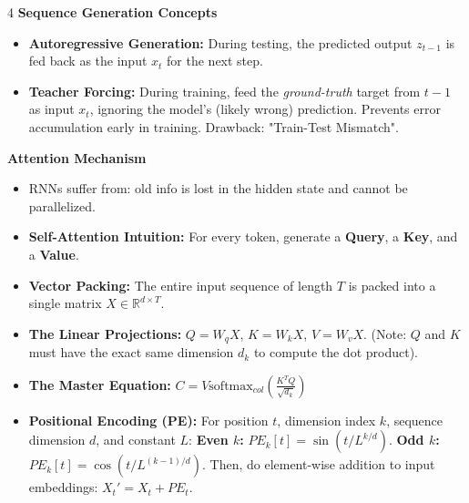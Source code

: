 \documentclass[8pt,landscape,a4paper]{extarticle}
\begin{document}
\begin{multicols*}{4}
\vspace{1mm}
\noindent\textbf{Sequence Generation Concepts}
\begin{itemize}[leftmargin=*, nosep]
    \item \textbf{Autoregressive Generation:} During testing, the predicted output $z_{t-1}$ is fed back as the input $x_t$ for the next step.
    \item \textbf{Teacher Forcing:} During training, feed the \textit{ground-truth} target from $t-1$ as input $x_t$, ignoring the model's (likely wrong) prediction. Prevents error accumulation early in training. Drawback: "Train-Test Mismatch".
\end{itemize}

\vspace{1mm}
\noindent\textbf{Attention Mechanism}
\begin{itemize}[leftmargin=*, nosep]
    \item RNNs suffer from: old info is lost in the hidden state and cannot be parallelized.
    \item \textbf{Self-Attention Intuition:} For every token, generate a \textbf{Query}, a \textbf{Key}, and a \textbf{Value}. 
    \item \textbf{Vector Packing:} The entire input sequence of length $T$ is packed into a single matrix $X \in \mathbb{R}^{d \times T}$.
    \item \textbf{The Linear Projections:} $Q = W_q X$, $K = W_k X$, $V = W_v X$. (Note: $Q$ and $K$ must have the exact same dimension $d_k$ to compute the dot product).
    \item \textbf{The Master Equation:} 
    $C = V \text{softmax}_{col} \left( \frac{K^T Q}{\sqrt{d_k}} \right)$
    \item \textbf{Positional Encoding (PE):} For position $t$, dimension index $k$, sequence dimension $d$, and constant $L$: 
    \textbf{Even $k$:} $PE_k[t] = \sin(t / L^{k/d})$. \textbf{Odd $k$:} $PE_k[t] = \cos(t / L^{(k-1)/d})$. Then, do element-wise addition to input embeddings: $X_t' = X_t + PE_t$.
\end{itemize}


\end{multicols*}
\end{document}
